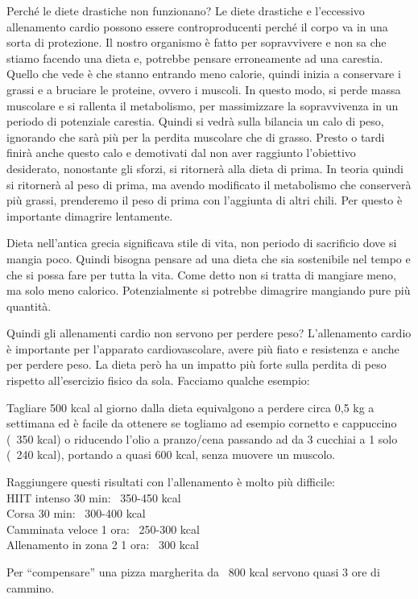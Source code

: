 \documentclass[12pt]{book} %
\begin{document}
Perché le diete drastiche non funzionano?
Le diete drastiche e l'eccessivo allenamento cardio possono essere controproducenti perché il corpo va in una sorta di protezione. Il nostro organismo è fatto per sopravvivere e non sa che stiamo facendo una dieta e, potrebbe pensare erroneamente ad una carestia. Quello che vede è che stanno entrando meno calorie, quindi inizia a conservare i grassi e a bruciare le proteine, ovvero i muscoli. In questo modo, si perde massa muscolare e si rallenta il metabolismo, per massimizzare la sopravvivenza in un periodo di potenziale carestia. Quindi si vedrà sulla bilancia un calo di peso, ignorando che sarà più per la perdita muscolare che di grasso. Presto o tardi finirà anche questo calo e demotivati dal non aver raggiunto l'obiettivo desiderato, nonostante gli sforzi, si ritornerà alla dieta di prima. In teoria quindi si ritornerà al peso di prima, ma avendo modificato il metabolismo che conserverà più grassi, prenderemo il peso di prima con l'aggiunta di altri chili.
Per questo è importante dimagrire lentamente.

Dieta nell'antica grecia significava stile di vita, non periodo di sacrificio dove si mangia poco. Quindi bisogna pensare ad una dieta che sia sostenibile nel tempo e che si possa fare per tutta la vita. Come detto non si tratta di mangiare meno, ma solo meno calorico. Potenzialmente si potrebbe dimagrire mangiando pure più quantità.

Quindi gli allenamenti cardio non servono per perdere peso?
L'allenamento cardio è importante per l'apparato cardiovascolare, avere più fiato e resistenza e anche per perdere peso. La dieta però ha un impatto più forte sulla perdita di peso rispetto all’esercizio fisico da sola. Facciamo qualche esempio:

Tagliare 500 kcal al giorno dalla dieta equivalgono a perdere circa 0,5 kg a settimana ed è facile da ottenere se togliamo ad esempio cornetto e cappuccino (~350 kcal) o riducendo l'olio a pranzo/cena passando ad da 3 cucchiai a 1 solo (~240 kcal), portando a quasi 600 kcal, senza muovere un muscolo.

Raggiungere questi risultati con l'allenamento è molto più difficile:\\
HIIT intenso 30 min: ~350-450 kcal\\
Corsa 30 min: ~300-400 kcal\\
Camminata veloce 1 ora: ~250-300 kcal\\
Allenamento in zona 2 1 ora: ~300 kcal

Per “compensare” una pizza margherita da ~800 kcal servono quasi 3 ore di cammino.
\end{document}
